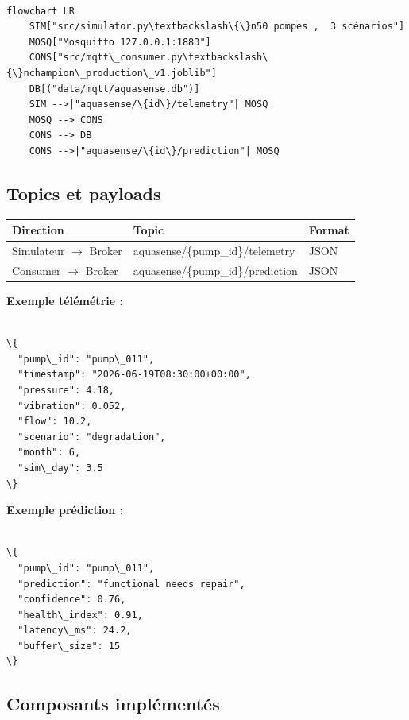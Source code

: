 \documentclass[11pt,a4paper]{report}
\begin{document}
\begin{lstlisting}

flowchart LR
    SIM["src/simulator.py\textbackslash\{\}n50 pompes ,  3 scénarios"]
    MOSQ["Mosquitto 127.0.0.1:1883"]
    CONS["src/mqtt\_consumer.py\textbackslash\{\}nchampion\_production\_v1.joblib"]
    DB[("data/mqtt/aquasense.db")]
    SIM -->|"aquasense/\{id\}/telemetry"| MOSQ
    MOSQ --> CONS
    CONS --> DB
    CONS -->|"aquasense/\{id\}/prediction"| MOSQ

\end{lstlisting}

\subsection{Topics et payloads}

{\small
\begin{longtable}{@{}>{\raggedright\arraybackslash}p{}>{\raggedright\arraybackslash}p{}>{\raggedright\arraybackslash}p{}@{}}
\toprule
\rowcolor{EHTPTableHead}Direction & Topic & Format \\
\midrule
Simulateur $\rightarrow$ Broker & aquasense/\{pump\_id\}/telemetry & JSON \\
Consumer $\rightarrow$ Broker & aquasense/\{pump\_id\}/prediction & JSON \\
\bottomrule
\end{longtable}
}

\textbf{Exemple télémétrie :}

\begin{lstlisting}

\{
  "pump\_id": "pump\_011",
  "timestamp": "2026-06-19T08:30:00+00:00",
  "pressure": 4.18,
  "vibration": 0.052,
  "flow": 10.2,
  "scenario": "degradation",
  "month": 6,
  "sim\_day": 3.5
\}

\end{lstlisting}

\textbf{Exemple prédiction :}

\begin{lstlisting}

\{
  "pump\_id": "pump\_011",
  "prediction": "functional needs repair",
  "confidence": 0.76,
  "health\_index": 0.91,
  "latency\_ms": 24.2,
  "buffer\_size": 15
\}

\end{lstlisting}

\subsection{Composants implémentés}
\end{document}
